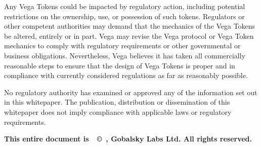 \begin{scriptsize}
Any Vega Tokens could be impacted by regulatory action, including potential restrictions on the ownership, use, or possession of such tokens. Regulators or other competent authorities may demand that the mechanics of the Vega Tokens be altered, entirely or in part. Vega may revise the Vega protocol or Vega Token mechanics to comply with regulatory requirements or other governmental or business obligations. Nevertheless, Vega believes it has taken all commercially reasonable steps to ensure that the design of Vega Tokens is proper and in compliance with currently considered regulations as far as reasonably possible. 

No regulatory authority has examined or approved any of the information set out in this whitepaper. The publication, distribution or dissemination of this whitepaper does not imply compliance with applicable laws or regulatory requirements.

\vspace{1em}\noindent \textbf{This entire document is~~\copyright~\the\year, Gobalsky Labs Ltd. All rights reserved.}\par
\end{scriptsize}

